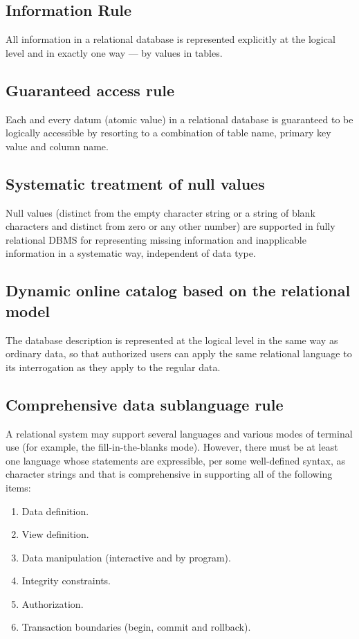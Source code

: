 \subsection{Information Rule}
  All information in a relational database is represented explicitly at the logical level and in exactly one way --- by values in tables.

\subsection{Guaranteed access rule}
  Each and every datum (atomic value) in a relational database is guaranteed to be logically accessible by resorting to a combination of table name, primary key value and column name.

\subsection{Systematic treatment of null values}
  Null values (distinct from the empty character string or a string of blank characters and distinct from zero or any other number) are supported in fully relational DBMS for representing missing information and inapplicable information in a systematic way, independent of data type.

\subsection{Dynamic online catalog based on the relational model}
  The database description is represented at the logical level in the same way as ordinary data, so that authorized users can apply the same relational language to its interrogation as they apply to the regular data.

\subsection{Comprehensive data sublanguage rule}
  A relational system may support several languages and various modes of terminal use (for example, the fill-in-the-blanks mode). However, there must be at least one language whose statements are expressible, per some well-defined syntax, as character strings and that is comprehensive in supporting all of the following items:
  \begin{enumerate}
  \item Data definition.
  \item View definition.
  \item Data manipulation (interactive and by program).
  \item Integrity constraints.
  \item Authorization.
  \item Transaction boundaries (begin, commit and rollback).
  \end{enumerate}

